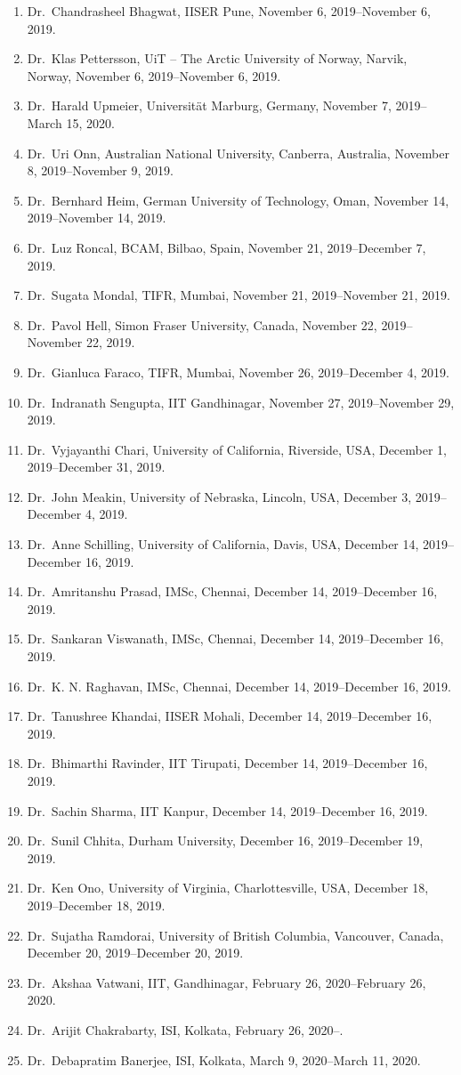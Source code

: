\begin{enumerate}
\item Dr.~Chandrasheel Bhagwat, IISER Pune, November 6, 2019--November 6, 2019.
\item Dr.~Klas Pettersson, UiT – The Arctic University of Norway, Narvik, Norway, November 6, 2019--November 6, 2019.
\item Dr.~Harald Upmeier, Universität Marburg, Germany, November 7, 2019--March 15, 2020.
\item Dr.~Uri Onn, Australian National University, Canberra, Australia, November 8, 2019--November 9, 2019.
\item Dr.~Bernhard Heim, German University of Technology, Oman, November 14, 2019--November 14, 2019.
\item Dr.~Luz Roncal, BCAM, Bilbao, Spain, November 21, 2019--December 7, 2019.
\item Dr.~Sugata Mondal, TIFR, Mumbai, November 21, 2019--November 21, 2019.
\item Dr.~Pavol Hell, Simon Fraser University, Canada, November 22, 2019--November 22, 2019.
\item Dr.~Gianluca Faraco, TIFR, Mumbai, November 26, 2019--December 4, 2019.
\item Dr.~Indranath Sengupta, IIT Gandhinagar, November 27, 2019--November 29, 2019.
\item Dr.~Vyjayanthi Chari, University of California, Riverside, USA, December 1, 2019--December 31, 2019.
\item Dr.~John Meakin, University of Nebraska, Lincoln, USA, December 3, 2019--December 4, 2019.
\item Dr.~Anne Schilling, University of California, Davis, USA, December 14, 2019--December 16, 2019.
\item Dr.~Amritanshu Prasad, IMSc, Chennai, December 14, 2019--December 16, 2019.
\item Dr.~Sankaran Viswanath, IMSc, Chennai, December 14, 2019--December 16, 2019.
\item Dr.~K. N. Raghavan, IMSc, Chennai, December 14, 2019--December 16, 2019.
\item Dr.~Tanushree Khandai, IISER Mohali, December 14, 2019--December 16, 2019.
\item Dr.~Bhimarthi Ravinder, IIT Tirupati, December 14, 2019--December 16, 2019.
\item Dr.~Sachin Sharma, IIT Kanpur, December 14, 2019--December 16, 2019.
\item Dr.~Sunil Chhita, Durham University, December 16, 2019--December 19, 2019.
\item Dr.~Ken Ono, University of Virginia, Charlottesville, USA, December 18, 2019--December 18, 2019.
\item Dr.~Sujatha Ramdorai, University of British Columbia, Vancouver, Canada, December 20, 2019--December 20, 2019.
\item Dr.~Akshaa Vatwani, IIT, Gandhinagar, February 26, 2020--February 26, 2020.
\item Dr.~Arijit Chakrabarty, ISI, Kolkata, February 26, 2020--.
\item Dr.~Debapratim Banerjee, ISI, Kolkata, March 9, 2020--March 11, 2020.
\end{enumerate}
